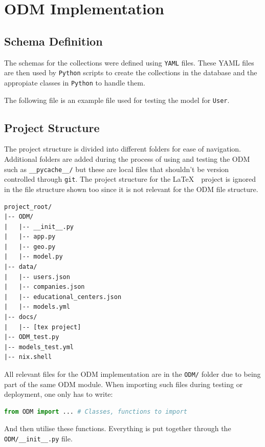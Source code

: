 \documentclass[english]{article}
\begin{document}
\section{ODM Implementation}

\subsection{Schema Definition}

\par
The schemas for the collections were defined using \texttt{YAML} files. These
YAML files are then used by \texttt{Python} scripts to create the collections
in the database and the appropiate classes in \texttt{Python} to handle them.

\par
The following file is an example file used for testing the model for
\texttt{User}.


\color{black}

\subsection{Project Structure}

\par
The project structure is divided into different folders for ease of navigation.
Additional folders are added during the process of using and testing the ODM
such as \texttt{\_\_pycache\_\_/} but these are local files that shouldn't be
version controlled through \texttt{git}. The project structure for the \LaTeX\
\ project is ignored in the file structure shown too since it is not relevant for
the ODM file structure.

\begin{verbatim}
project_root/
|-- ODM/
|   |-- __init__.py
|   |-- app.py
|   |-- geo.py
|   |-- model.py
|-- data/
|   |-- users.json
|   |-- companies.json
|   |-- educational_centers.json
|   |-- models.yml
|-- docs/
|   |-- [tex project]
|-- ODM_test.py
|-- models_test.yml
|-- nix.shell
\end{verbatim}

\par
All relevant files for the ODM implementation are in the \texttt{ODM/} folder
due to being part of the same ODM module. When importing such files during
testing or deployment, one only has to write:

\begin{lstlisting}[language=Python]
from ODM import ... # Classes, functions to import
\end{lstlisting}

And then utilise these functions. Everything is put together through the
\texttt{ODM/\_\_init\_\_.py} file.




%
\end{document}
